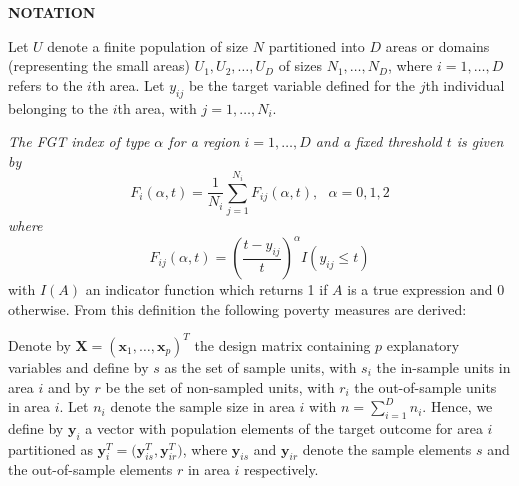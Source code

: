 \documentclass[a4paper, 11pt]{article}
\begin{document}
\textbf{NOTATION}

Let $U$ denote a finite population of size $N$ partitioned into $D$ areas or domains (representing the small areas) $U_1,U_2,\ldots,U_D$ of sizes $N_1,\ldots, N_D$, where $i=1,\ldots,D$ refers to the $i$th area. Let $y_{ij}$ be the target variable defined for the $j$th individual belonging to the $i$th area, with $j=1,\ldots,N_i$.



\textit{The FGT index of type $\alpha$ for a region $i=1,\ldots,D$ and a fixed threshold $t$ is given by}
\begin{equation}\label{eq:FGT}
F_{i}(\alpha,t)=\frac{1}{N_i}\sum_{j=1}^{N_i} F_{ij}(\alpha,t), \,\,\,\, \alpha=0,1,2
\end{equation}
\textit{where}
\begin{equation*}
F_{ij}(\alpha,t)= \left( \frac{t-y_{ij} }{t} \right)^\alpha I (y_{ij} \leq t)
\end{equation*}
with $I(A)$ an indicator function which returns 1 if $A$ is a true expression and 0 otherwise. From this definition the following poverty measures are derived:



 Denote by $\mathbf{X}=(\mathbf{x}_1,\ldots,\mathbf{x}_p)^{T}$ the design matrix containing $p$ explanatory variables and define by $s$ as the set of sample units, with $s_i$ the in-sample units in area $i$ and by $r$ be the set of non-sampled units, with $r_i$ the out-of-sample units in area $i$. Let $n_i$ denote the sample size in area $i$ with $n=\sum_{i=1}^{D}n_i$. Hence, we define by $\mathbf{y}_{i}$ a vector with population elements of the target outcome for area $i$ partitioned as $\mathbf{y}_i^T= \Big(\mathbf{y}_{is}^T,\mathbf{y}_{ir}^T\Big) $, where $\mathbf{y}_{is}$ and $\mathbf{y}_{ir}$ denote the sample elements $s$ and the out-of-sample elements $r$ in area $i$ respectively.
\end{document}

